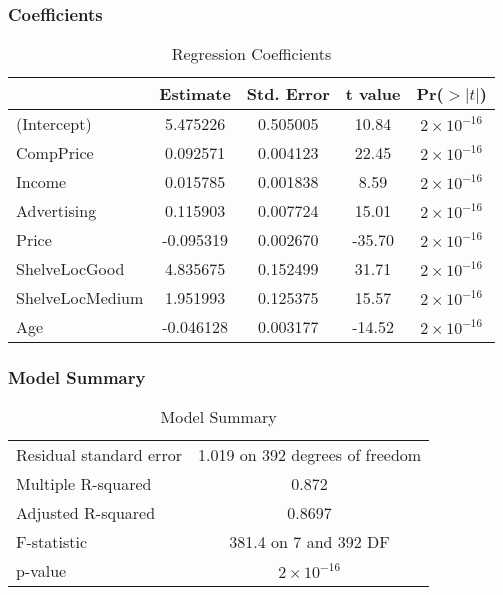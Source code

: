 \documentclass{article}
\theoremstyle{mytheoremstyle}
\theoremstyle{mytheoremstyle}
\theoremstyle{myproblemstyle}
\begin{document}
      \subsubsection{Coefficients}
      \begin{table}[H]
          \centering
          \begin{tabular}{lcccc}
              \toprule
              & Estimate & Std. Error & t value & Pr($>|t|$) \\
              \midrule
              (Intercept) & 5.475226 & 0.505005 & 10.84 & $2 \times 10^{-16}$ \\
              CompPrice & 0.092571 & 0.004123 & 22.45 & $2 \times 10^{-16}$ \\
              Income & 0.015785 & 0.001838 & 8.59 & $2 \times 10^{-16}$ \\
              Advertising & 0.115903 & 0.007724 & 15.01 & $2 \times 10^{-16}$ \\
              Price & -0.095319 & 0.002670 & -35.70 & $2 \times 10^{-16}$ \\
              ShelveLocGood & 4.835675 & 0.152499 & 31.71 & $2 \times 10^{-16}$ \\
              ShelveLocMedium & 1.951993 & 0.125375 & 15.57 & $2 \times 10^{-16}$ \\
              Age & -0.046128 & 0.003177 & -14.52 & $2 \times 10^{-16}$ \\
              \bottomrule
          \end{tabular}
          \caption{Regression Coefficients}
          \label{tab:coefficients}
      \end{table}

      \subsubsection{Model Summary}
      \begin{table}[H]
          \centering
          \begin{tabular}{lc}
              \toprule
              Residual standard error & 1.019 on 392 degrees of freedom \\
              Multiple R-squared & 0.872 \\
              Adjusted R-squared & 0.8697 \\
              F-statistic & 381.4 on 7 and 392 DF \\
              p-value & $2 \times 10^{-16}$ \\
              \bottomrule
          \end{tabular}
          \caption{Model Summary}
          \label{tab:model_summary_updated}
      \end{table}
\end{document}
